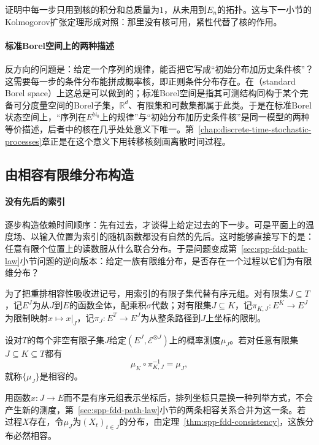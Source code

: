 证明中每一步只用到核的积分和总质量为$1$，从未用到$E_n$的拓扑。这与下一小节的Kolmogorov扩张定理形成对照：那里没有核可用，紧性代替了核的作用。

\paragraph{标准Borel空间上的两种描述}
反方向的问题是：给定一个序列的规律，能否把它写成“初始分布加历史条件核”？这需要每一步的条件分布能拼成概率核，即正则条件分布存在。在（standard Borel space）上这总是可以做到的；标准Borel空间是指其可测结构同构于某个完备可分度量空间的Borel子集，$\mathbb R^d$、有限集和可数集都属于此类。于是在标准Borel状态空间上，“序列在$E^{\mathbb N_0}$上的规律”与“初始分布加历史条件核”是同一模型的两种等价描述，后者中的核在几乎处处意义下唯一。第~\ref{chap:discrete-time-stochastic-processes}章正是在这个意义下用转移核刻画离散时间过程。

\subsection{由相容有限维分布构造}
\label{sec:spp-kolmogorov-extension}

\paragraph{没有先后的索引}
逐步构造依赖时间顺序：先有过去，才谈得上给定过去的下一步。可是平面上的温度场、以输入位置为索引的随机函数都没有自然的先后。这时能够直接写下的是：任意有限个位置上的读数服从什么联合分布。于是问题变成第~\ref{sec:spp-fdd-path-law}小节问题的逆向版本：给定一族有限维分布，是否存在一个过程以它们为有限维分布？

为了把重排相容性吸收进记号，用索引的有限子集代替有序元组。对有限集$J\subseteq T$，记$E^J$为从$J$到$E$的函数全体，配乘积$\sigma$代数；对有限集$J\subseteq K$，记$\pi_{K,J}:E^K\to E^J$为限制映射$x\mapsto x|_J$，记$\pi_J:E^T\to E^J$为从整条路径到$J$上坐标的限制。

\begin{definition}[相容的有限维分布族]
\label{def:spp-consistent-family}
设对$T$的每个非空有限子集$J$给定$(E^J,\mathcal E^{\otimes J})$上的概率测度$\mu_J$。若对任意有限集$J\subseteq K\subseteq T$都有
\[
  \mu_K\circ\pi_{K,J}^{-1}=\mu_J ,
\]
就称$\{\mu_J\}$是相容的。
\end{definition}

用函数$x:J\to E$而不是有序元组表示坐标后，排列坐标只是换一种列举方式，不会产生新的测度，第~\ref{sec:spp-fdd-path-law}小节的两条相容关系合并为这一条。若过程$X$存在，令$\mu_J$为$(X_t)_{t\in J}$的分布，由定理~\ref{thm:spp-fdd-consistency}，这族分布必然相容。

